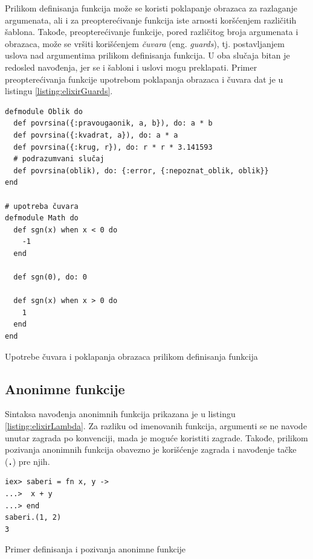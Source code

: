 \documentclass[12pt,oneside]{memoir}
\begin{document}
Prilikom definisanja funkcija može se koristi poklapanje obrazaca za razlaganje argumenata,
ali i za preopterećivanje funkcija iste arnosti koršćenjem različitih šablona. Takođe,
preopterećivanje funkcije, pored različitog broja argumenata i obrazaca, može se vršiti 
korišćenjem \emph{čuvara} (eng. \emph{guards}), tj. postavljanjem uslova nad argumentima
prilikom definisanja funkcija. U oba slučaja bitan je redosled navođenja, jer se i šabloni
i uslovi mogu preklapati. Primer preopterećivanja funkcije upotrebom poklapanja obrazaca
i čuvara dat je u listingu \ref{listing:elixirGuards}.
\begin{listing}[!h]
\begin{verbatim}
defmodule Oblik do
  def povrsina({:pravougaonik, a, b}), do: a * b
  def povrsina({:kvadrat, a}), do: a * a
  def povrsina({:krug, r}), do: r * r * 3.141593
  # podrazumvani slučaj
  def povrsina(oblik), do: {:error, {:nepoznat_oblik, oblik}}
end

# upotreba čuvara
defmodule Math do
  def sgn(x) when x < 0 do
    -1
  end
  
  def sgn(0), do: 0
  
  def sgn(x) when x > 0 do
    1
  end 
end
\end{verbatim}
\caption{Upotrebe čuvara i poklapanja obrazaca prilikom definisanja funkcija}
\label{listing:elixirGuards}
\end{listing}
\subsection{Anonimne funkcije}
Sintaksa navođenja anonimnih funkcija prikazana je u listingu \ref{listing:elixirLambda}. Za
razliku od imenovanih funkcija, argumenti se ne navode unutar zagrada po konvenciji, mada je
moguće koristiti zagrade. Takođe, prilikom pozivanja anonimnih funkcija obavezno je korišćenje
zagrada i navođenje tačke (\texttt{\textbf{.}}) pre njih. 
\begin{listing}[!h]
\begin{verbatim}
iex> saberi = fn x, y ->
...>  x + y
...> end
saberi.(1, 2)
3
\end{verbatim}
\caption{Primer definisanja i pozivanja anonimne funkcije}
\label{listing:elixirLambda}
\end{listing}
\end{document}
